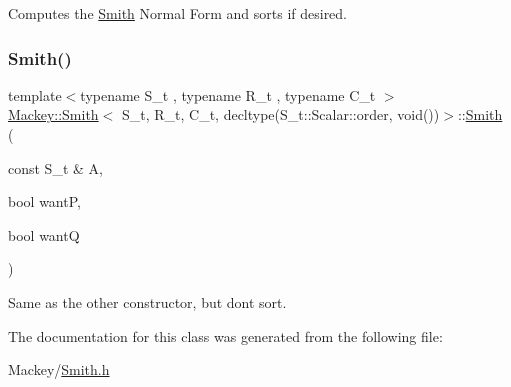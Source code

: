 Computes the \hyperlink{classMackey_1_1Smith}{Smith} Normal Form and sorts if desired. 

\mbox{\label{classMackey_1_1Smith_3_01S__t_00_01R__t_00_01C__t_00_01decltype_07S__t_1_1Scalar_1_1order_00_01void_07_08_08_4_ad4bdf593897252b89ec2a835d155dec0}} 
\subsubsection{\texorpdfstring{Smith()}{Smith()}\hspace{0.1cm}{\footnotesize\ttfamily [2/2]}}
{\footnotesize\ttfamily template$<$typename S\+\_\+t , typename R\+\_\+t , typename C\+\_\+t $>$ \\
\hyperlink{classMackey_1_1Smith}{Mackey\+::\+Smith}$<$ S\+\_\+t, R\+\_\+t, C\+\_\+t, decltype(S\+\_\+t\+::\+Scalar\+::order, void())$>$\+::\hyperlink{classMackey_1_1Smith}{Smith} (\begin{DoxyParamCaption}\item[{const S\+\_\+t \&}]{A,  }\item[{bool}]{wantP,  }\item[{bool}]{wantQ }\end{DoxyParamCaption})\hspace{0.3cm}{\ttfamily [inline]}}



Same as the other constructor, but don\textquotesingle{}t sort. 



The documentation for this class was generated from the following file\+:\begin{DoxyCompactItemize}
\item 
Mackey/\hyperlink{Smith_8h}{Smith.\+h}\end{DoxyCompactItemize}
